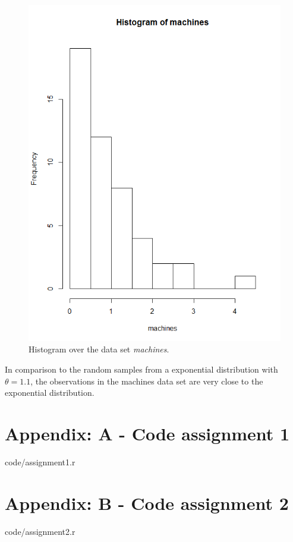 \documentclass[a4paper,12pt]{article}
\begin{document}
\begin{figure}[H]
\begin{minipage}[]{0.4\textwidth}
  \includegraphics[width=\textwidth]{figures/Lab1_A2_hist_machines.png}  
  \caption{Histogram over the data set \textit{machines}.\label{fig:Histogram over the data set machines} }
 \end{minipage}
\end{figure}
In comparison to the random samples from a exponential distribution with \(\theta = 1.1\), the observations in the machines data set are very close to the exponential distribution.

\section{Appendix: A - Code assignment 1}


    {code/assignment1.r}

\section{Appendix: B - Code assignment 2}


    {code/assignment2.r}
\end{document}
